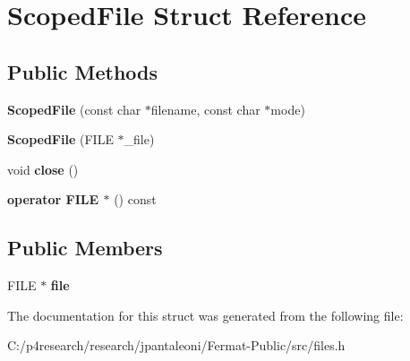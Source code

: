 \hypertarget{struct_scoped_file}{}\section{Scoped\+File Struct Reference}
\label{struct_scoped_file}
\subsection*{Public Methods}
\begin{DoxyCompactItemize}
\item 
\mbox{\label{struct_scoped_file_af1e89cf38c71131287e59de254e45d01}} 
{\bfseries Scoped\+File} (const char $\ast$filename, const char $\ast$mode)
\item 
\mbox{\label{struct_scoped_file_a61b09a3142458c6cbaf7c68e80288e1f}} 
{\bfseries Scoped\+File} (F\+I\+LE $\ast$\+\_\+file)
\item 
\mbox{\label{struct_scoped_file_aac704c553f57079444f14e16607a9e33}} 
void {\bfseries close} ()
\item 
\mbox{\label{struct_scoped_file_ac3283b683d1bb1c54c8a99ffcd6af02a}} 
{\bfseries operator F\+I\+L\+E $\ast$} () const
\end{DoxyCompactItemize}
\subsection*{Public Members}
\begin{DoxyCompactItemize}
\item 
\mbox{\label{struct_scoped_file_a28aaabaab5aa600edebde3333c900f20}} 
F\+I\+LE $\ast$ {\bfseries file}
\end{DoxyCompactItemize}


The documentation for this struct was generated from the following file\+:\begin{DoxyCompactItemize}
\item 
C\+:/p4research/research/jpantaleoni/\+Fermat-\/\+Public/src/files.\+h\end{DoxyCompactItemize}
